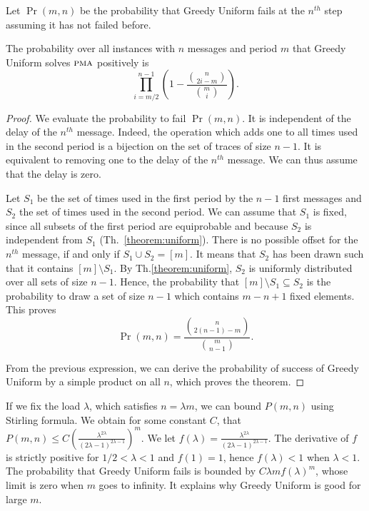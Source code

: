 \documentclass[a4paper,UKenglish,cleveref, autoref, thm-restate]{lipics-v2019}
\newcommand\pma{\textsc{pma}\xspace}
\begin{document}
Let $\Pr(m,n)$ be the probability that Greedy Uniform fails at the $n^{th}$ step assuming it has not failed before.


\begin{theorem}\label{theorem:uniform}
The probability over all instances with $n$ messages and period $m$ that Greedy Uniform solves $\pma$ positively is $$\displaystyle{\prod_{i=m/2}^{n-1}(1 - \frac{\binom{n}{2i-m}}{\binom{m}{i}})}.$$
\end{theorem}

\begin{proof}
We evaluate the probability to fail $\Pr(m,n)$. It is independent of the delay of the $n^{th}$
message. Indeed, the operation which adds one to all times used 
in the second period is a bijection on the set of traces of size $n-1$. It is equivalent to removing one to the delay of the $n^{th}$ message. We can thus assume that the delay is zero.

Let $S_1$ be the set of times used in the first period by the $n-1$ first messages
and $S_2$ the set of times used in the second period. We can assume that $S_1$ is fixed, since all subsets of the first period are equiprobable and because $S_2$ is independent from $S_1$ (Th.~\ref{theorem:uniform}). There is no possible offset for the $n^{th}$ message, if and only if $S_1 \cup S_2 = [m]$. It means that $S_2$ has been drawn such that it contains $[m] \setminus S_1$. By Th.\ref{theorem:uniform}, $S_2$ is uniformly distributed over all sets of size $n-1$. Hence, the probability that  $[m]  \setminus S_1 \subseteq S_2$  is the probability to draw a set of size $n-1$ which contains $m-n + 1$ fixed elements. This proves  $$\Pr(m,n) = \frac{\binom{n}{2(n-1)-m}}{\binom{m}{n-1}}.$$


From the previous expression, we can derive the probability of success of Greedy Uniform by a simple product on all $n$, which proves the theorem. 
\end{proof}


If we fix the load $\lambda$, which satisfies $n = \lambda m$, we can bound 
$P(m,n)$ using Stirling formula. We obtain for some constant $C$, 
that $P(m,n) \leq C \left(\frac{\lambda^{2\lambda}}{(2\lambda -1)^{2\lambda -1}}\right)^m$.
We let $f(\lambda) = \frac{\lambda^{2\lambda}}{(2\lambda -1)^{2\lambda -1}}$.
The derivative of $f$ is strictly positive for $1/2 < \lambda < 1$ and $f(1) = 1$, hence 
$f(\lambda) < 1$ when $\lambda < 1$. The probability that Greedy Uniform fails is bounded 
by $C \lambda m f(\lambda)^m$, whose limit is zero when $m$ goes to infinity. 
It explains why Greedy Uniform is good for large $m$. 
\end{document}
